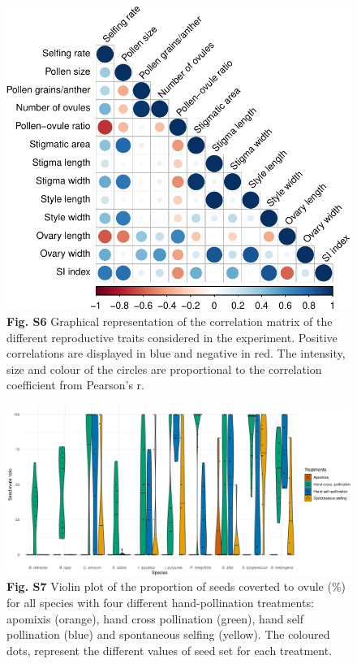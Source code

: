 \documentclass[12pt,]{article}
\begin{document}
\begin{figure}
\centering
\includegraphics{Supp_Material_files/figure-latex/unnamed-chunk-14-1.pdf}
\caption{\textbf{Fig. S6} Graphical representation of the correlation
matrix of the different reproductive traits considered in the
experiment. Positive correlations are displayed in blue and negative in
red. The intensity, size and colour of the circles are proportional to
the correlation coefficient from Pearson's r.}
\end{figure}

\clearpage

\begin{figure}
\centering
\includegraphics{Supp_Material_files/figure-latex/unnamed-chunk-15-1.pdf}
\caption{\textbf{Fig. S7} Violin plot of the proportion of seeds
coverted to ovule (\%) for all species with four different
hand-pollination treatments: apomixis (orange), hand cross pollination
(green), hand self pollination (blue) and spontaneous selfing (yellow).
The coloured dots, represent the different values of seed set for each
treatment.}
\end{figure}
\end{document}
